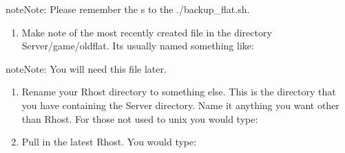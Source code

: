 \documentclass[letterpaper,10pt,english]{sphinxmanual}
\begin{document}
\begin{sphinxadmonition}{note}{Note:}
\sphinxAtStartPar
Please remember the \textquotesingle{}\sphinxhyphen{}s\textquotesingle{} to the ./backup\_flat.sh.
\end{sphinxadmonition}
\begin{enumerate}
%
\setcounter{enumi}{3}
\item {} 
\sphinxAtStartPar
Make note of the most recently created file in the directory Server/game/oldflat.  It\textquotesingle{}s usually named something like:

\begin{sphinxVerbatim}[commandchars=\\\{\}]
\end{sphinxVerbatim}

\end{enumerate}

\begin{sphinxadmonition}{note}{Note:}
\sphinxAtStartPar
You will need this file later.
\end{sphinxadmonition}
\begin{enumerate}
%
\setcounter{enumi}{4}
\item {} 
\sphinxAtStartPar
Rename your \textquotesingle{}Rhost\textquotesingle{} directory to something else.  This is the directory that you have containing the \textquotesingle{}Server\textquotesingle{} directory.  Name it anything you want other than \textquotesingle{}Rhost\textquotesingle{}.  For those not used to unix you would type:

\begin{sphinxVerbatim}[commandchars=\\\{\}]
  
\end{sphinxVerbatim}

\item {} 
\sphinxAtStartPar
Pull in the latest Rhost.  You would type:

\begin{sphinxVerbatim}[commandchars=\\\{\}]
   
\end{sphinxVerbatim}

\end{enumerate}
\end{document}
